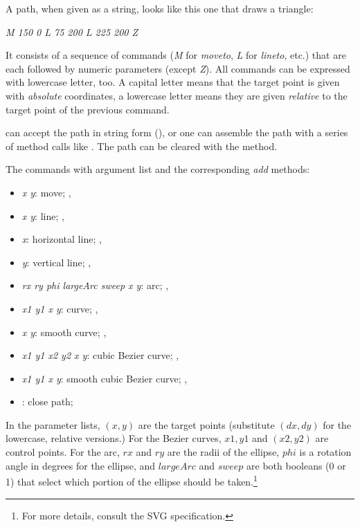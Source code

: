 A path, when given as a string, looks like this one that draws a triangle:

\textit{M 150 0 L 75 200 L 225 200 Z}

It consists of a sequence of commands (\textit{M} for \textit{moveto},
\textit{L} for \textit{lineto}, etc.) that are each followed by numeric
parameters (except \textit{Z}). All commands can be expressed with
lowercase letter, too. A capital letter means that the target point is
given with \textit{absolute} coordinates, a lowercase letter means they are
given \textit{relative} to the target point of the previous command.

 can accept the path in string form (),
or one can assemble the path with a series of method calls like
. The path can be cleared with the 
method.

The commands with argument list and the corresponding \textit{add} methods:

\begin{itemize}
\item {} \textit{x y}: move; , 
\item {} \textit{x y}: line; , 
\item {} \textit{x}: horizontal line; , 
\item {} \textit{y}: vertical line; , 
\item {} \textit{rx ry phi largeArc sweep x y}: arc; , 
\item {} \textit{x1 y1 x y}: curve; , 
\item {} \textit{x y}: smooth curve; , 
\item {} \textit{x1 y1 x2 y2 x y}: cubic Bezier curve; , 
\item {} \textit{x1 y1 x y}: smooth cubic Bezier curve; , 
\item {}: close path; 
\end{itemize}

In the parameter lists, $(x,y)$ are the target points (substitute $(dx,dy)$ for
the lowercase, relative versions.) For the Bezier curves, $x1,y1$ and
$(x2,y2)$ are control points. For the arc, $rx$ and $ry$ are the radii of the
ellipse, $phi$ is a rotation angle in degrees for the ellipse, and
$largeArc$ and $sweep$ are both booleans (0 or 1) that select which portion
of the ellipse should be taken.\footnote{For more details, consult the SVG
specification.}

